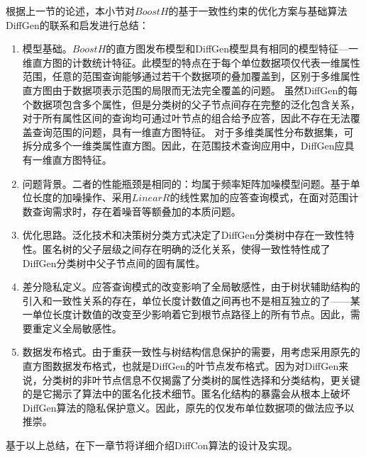 根据上一节的论述，本小节对$BoostH$的基于一致性约束的优化方案与基础算法DiffGen的联系和启发进行总结：
\begin{enumerate}
	\item 模型基础。$BoostH$的直方图发布模型和DiffGen模型具有相同的模型特征---一维直方图的计数统计特征。此模型的特点在于每个单位数据项仅代表一维属性范围，任意的范围查询能够通过若干个数据项的叠加覆盖到，区别于多维属性直方图由于数据项表示范围的局限而无法完全覆盖的问题。
	虽然DiffGen的每个数据项包含多个属性，但是分类树的父子节点间存在完整的泛化包含关系，对于所有属性区间的查询均可通过叶节点的组合给予应答，因此不存在无法覆盖查询范围的问题，具有一维直方图特征。
	对于多维类属性分布数据集，可拆分成多个一维类属性直方图。因此，在范围技术查询应用中，DiffGen应具有一维直方图特征。
	\item 问题背景。二者的性能瓶颈是相同的：均属于频率矩阵加噪模型问题。基于单位长度的加噪操作、采用$LinearR$的线性累加的应答查询模式，在面对范围计数查询需求时，存在着噪音等额叠加的本质问题。
	\item 优化思路。泛化技术和决策树分类方式决定了DiffGen分类树中存在一致性特性。匿名树的父子层级之间存在明确的泛化关系，使得一致性特性成了DiffGen分类树中父子节点间的固有属性。
	\item 差分隐私定义。应答查询模式的改变影响了全局敏感性，由于树状辅助结构的引入和一致性关系的存在，单位长度计数值之间再也不是相互独立的了——某一单位长度计数值的改变至少影响着它到根节点路径上的所有节点。因此，需要重定义全局敏感性。
	\item 数据发布格式。由于重获一致性与树结构信息保护的需要，用考虑采用原先的直方图数据发布格式，也就是DiffGen的叶节点发布格式。因为对DiffGen来说，分类树的非叶节点信息不仅揭露了分类树的属性选择和分类结构，更关键的是它揭示了算法中的匿名化技术细节。匿名化结构的暴露会从根本上破坏DiffGen算法的隐私保护意义。因此，原先的仅发布单位数据项的做法应予以推崇。
	
\end{enumerate}

基于以上总结，在下一章节将详细介绍DiffCon算法的设计及实现。